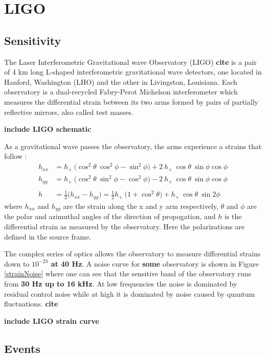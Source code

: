 \documentclass [12pt, proquest]{uwthesis}[2019]
\begin{document}
\section{LIGO}

\subsection{Sensitivity}

The Laser Interferometric Gravitational wave Observatory (LIGO) \textbf{cite} is a pair of 4 km long L-shaped interferometric gravitational wave detectors, one located in Hanford, Washington (LHO) and the other in Livingston, Louisiana. Each observatory is a dual-recycled Fabry-Perot Michelson interferometer which measures the differential strain between its two arms formed by pairs of partially reflective mirrors, also called test masses. 

\textbf{include LIGO schematic}

As a gravitational wave passes the observatory, the arms experience a strains that follow \cite{GWBook}:
\begin{align}
h_{xx}&=h_+\ \big( \cos^2\theta\ \cos^2\phi-\sin^2\phi \big)+2\ h_\times\ \cos \theta\ \sin \phi \cos \phi \\
h_{yy}&=h_+\ \big( \cos^2\theta\ \sin^2\phi-\cos^2\phi \big)-2\ h_\times\ \cos \theta\ \sin \phi \cos \phi \\
\nonumber \\
h&=\frac{1}{2} \big( h_{xx}-h_{yy} \big)=\frac{1}{2}h_+\ \big( 1+\cos^2\theta \big)+ h_\times\ \cos \theta\ \sin 2 \phi 
\end{align}
where $h_{xx}$ and $h_{yy}$ are the strain along the x and y arm respectively, $\theta$ and $\phi$ are the polar and azimuthal angles of the direction of propogation, and $h$ is the differential strain as measured by the observatory. Here the polarizations are defined in the source frame.

The complex series of optics allows the observatory to measure differential strains down to \textbf{$10^{-23}$ at 40 Hz}.  A noise curve for \textbf{some} observatory is shown in Figure \ref{strainNoise} where one can see that the sensitive band of the observatory runs from \textbf{30 Hz up to 16 kHz}. At low frequencies the noise is dominated by residual control noise while at high it is dominated by noise caused by quantum fluctuations.  \textbf{cite}

\textbf{include LIGO strain curve}

\subsection{Events}
\end{document}
